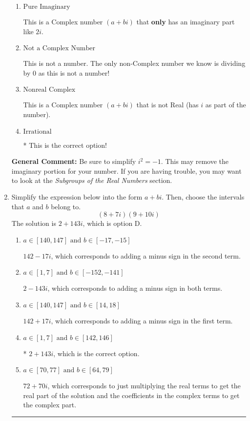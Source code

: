 \documentclass{extbook}[14pt]
\newcommand{\litem}[1]{\item #1

\rule{\textwidth}{0.4pt}}
\begin{document}
\begin{enumerate}
{\begin{enumerate}[label=\Alph*.]
These are numbers that can be written as fraction of Integers (e.g., -2/3 + 5)
\item \( \text{Pure Imaginary} \)

This is a Complex number $(a+bi)$ that \textbf{only} has an imaginary part like $2i$.
\item \( \text{Not a Complex Number} \)

This is not a number. The only non-Complex number we know is dividing by 0 as this is not a number!
\item \( \text{Nonreal Complex} \)

This is a Complex number $(a+bi)$ that is not Real (has $i$ as part of the number).
\item \( \text{Irrational} \)

* This is the correct option!
\end{enumerate}

\textbf{General Comment:} Be sure to simplify $i^2 = -1$. This may remove the imaginary portion for your number. If you are having trouble, you may want to look at the \textit{Subgroups of the Real Numbers} section.
}
\litem{
Simplify the expression below into the form $a+bi$. Then, choose the intervals that $a$ and $b$ belong to.
\[ (8 + 7 i)(9 + 10 i) \]The solution is \( 2 + 143 i \), which is option D.\begin{enumerate}[label=\Alph*.]
\item \( a \in [140, 147] \text{ and } b \in [-17, -15] \)

 $142 - 17 i$, which corresponds to adding a minus sign in the second term.
\item \( a \in [1, 7] \text{ and } b \in [-152, -141] \)

 $2 - 143 i$, which corresponds to adding a minus sign in both terms.
\item \( a \in [140, 147] \text{ and } b \in [14, 18] \)

 $142 + 17 i$, which corresponds to adding a minus sign in the first term.
\item \( a \in [1, 7] \text{ and } b \in [142, 146] \)

* $2 + 143 i$, which is the correct option.
\item \( a \in [70, 77] \text{ and } b \in [64, 79] \)

 $72 + 70 i$, which corresponds to just multiplying the real terms to get the real part of the solution and the coefficients in the complex terms to get the complex part.
\end{enumerate}

}
\end{enumerate}
\end{document}
